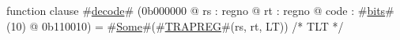 function clause #\hyperref[zdecode]{decode}# (0b000000 @ rs : regno @ rt : regno @ code : #\hyperref[zbits]{bits}#(10) @ 0b110010) =
  #\hyperref[zSome]{Some}#(#\hyperref[zTRAPREG]{TRAPREG}#(rs, rt, LT)) /* TLT */
